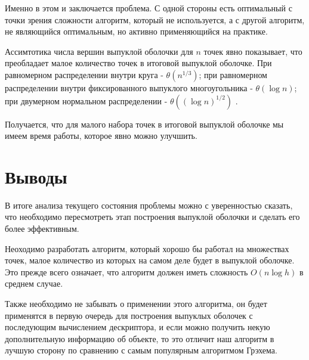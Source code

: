 Именно в этом и заключается проблема. С одной стороны есть оптимальный с точки зрения сложности алгоритм, который не используется, а с другой алгоритм, не являющийся оптимальным, но активно применяющийся на практике.

Ассимтотика числа вершин выпуклой оболочки для $n$ точек явно показывает, что преобладает малое количество точек в итоговой выпуклой оболочке. При равномерном распределении внутри круга - $\theta(n^{1/3})$; при равномерном распределении внутри фиксированного выпуклого многоугольника - $\theta(\log n)$; при двумерном нормальном распределении - $\theta((\log n)^{1/2})$ \cite{algolist2010convexhull}.

Получается, что для малого набора точек в итоговой выпуклой оболочке мы имеем время работы, которое явно можно улучшить.

\section{Выводы} \label{subsect1_4}

В итоге анализа текущего состояния проблемы можно с уверенностью сказать, что необходимо пересмотреть этап построения выпуклой оболочки и сделать его более эффективным.

Неоходимо разработать алгоритм, который хорошо бы работал на множествах точек, малое количество из которых на самом деле будет в выпуклой оболочке. Это прежде всего означает, что алгоритм должен иметь сложность $O(n \log h)$ в среднем случае.

Также необходимо не забывать о применении этого алгоритма, он будет применятся в первую очередь для построения выпуклых оболочек с последующим вычислением дескриптора, и если можно получить некую дополнительную информацию об объекте, то это отличит наш алгоритм в лучшую сторону по сравнению с самым популярным алгоритмом Грэхема.



